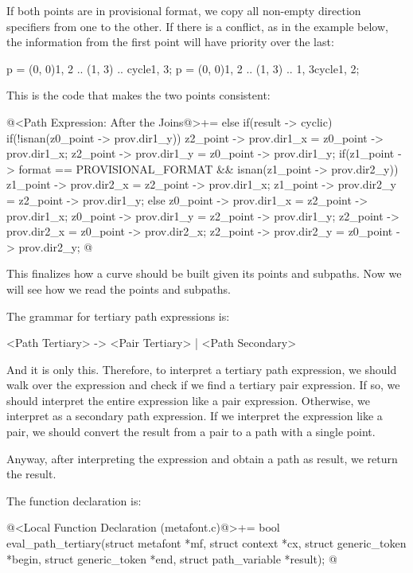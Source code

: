 {{{{{If both points are in provisional format, we copy all
non-empty direction specifiers from one to the
other. If there is a conflict, as in the example below, the
information from the first point will have priority over the last:

\alinhaverbatim
p = (0, 0){1, 2} .. (1, 3) .. cycle{1, 3};
p = (0, 0){1, 2} .. (1, 3) .. {1, 3}cycle{1, 2};
\alinhanormal

This is the code that makes the two points consistent:

\iniciocodigo
@<Path Expression: After the Joins@>+=
else if(result -> cyclic){
  if(!isnan(z0_point -> prov.dir1_y)){
    z2_point -> prov.dir1_x = z0_point -> prov.dir1_x;
    z2_point -> prov.dir1_y = z0_point -> prov.dir1_y;
    if(z1_point -> format == PROVISIONAL_FORMAT &&
       isnan(z1_point -> prov.dir2_y)){
      z1_point -> prov.dir2_x = z2_point -> prov.dir1_x;
      z1_point -> prov.dir2_y = z2_point -> prov.dir1_y;
    }
  }
  else{
    z0_point -> prov.dir1_x = z2_point -> prov.dir1_x;
    z0_point -> prov.dir1_y = z2_point -> prov.dir1_y;
  }
  z2_point -> prov.dir2_x = z0_point -> prov.dir2_x;
  z2_point -> prov.dir2_y = z0_point -> prov.dir2_y;
}
@
\fimcodigo

This finalizes how a curve should be built given its points and
subpaths. Now we will see how we read the points and subpaths.


The grammar for tertiary path expressions is:

\alinhaverbatim
<Path Tertiary> -> <Pair Tertiary> | <Path Secondary>
\alinhanormal

And it is only this. Therefore, to interpret a tertiary path
expression, we should walk over the expression and check if we find a
tertiary pair expression. If so, we should interpret the entire
expression like a pair expression. Otherwise, we interpret as a
secondary path expression. If we interpret the expression like a pair,
we should convert the result from a pair to a path with a single
point.

Anyway, after interpreting the expression and obtain a path as result,
we return the result.

The function declaration is:

\iniciocodigo
@<Local Function Declaration (metafont.c)@>+=
bool eval_path_tertiary(struct metafont *mf, struct context *cx,
                        struct generic_token *begin,
                        struct generic_token *end,
                        struct path_variable *result);
@
\fimcodigo

}}}}}
